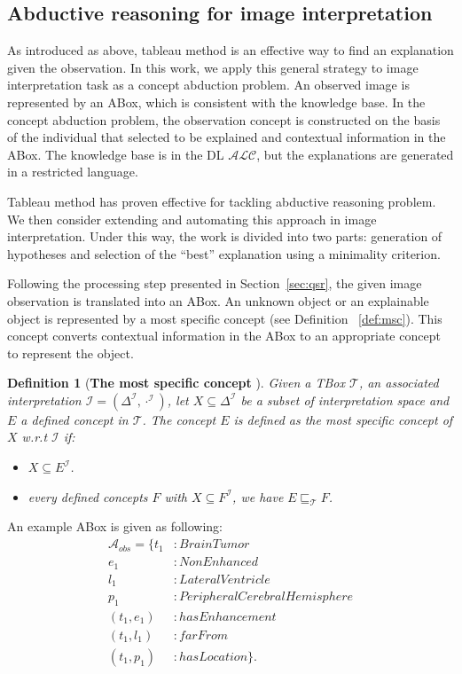 \documentclass{article}
\newtheorem{mydef}{Definition}
\begin{document}
\subsection{Abductive reasoning for image interpretation}
As introduced as above, tableau method is an effective way to find an explanation given the observation.
In this work, we apply this general strategy to image interpretation task as a concept abduction problem.
An observed image is represented by an ABox, which is consistent with the knowledge base. 
In the concept abduction problem, the observation concept is constructed on the basis of the individual that selected to be explained and
contextual information in the ABox.
The knowledge base is in the DL $\mathcal{ALC}$, but the explanations are generated in a restricted language.


Tableau method has proven effective for tackling abductive reasoning problem. We then consider extending and automating this approach in image interpretation.
Under this way, the work is divided into two parts: generation of hypotheses and selection of the ``best'' explanation using a minimality criterion.

Following the processing step presented in Section~\ref{sec:qsr}, the given image observation is translated into an ABox.
An unknown object or an explainable object is represented by a most specific concept (see Definition ~\ref{def:msc}).
This concept converts contextual information in the ABox to an appropriate concept to represent the object.
\begin{mydef}[\textbf{The most specific concept} \cite{atif2014explanatory}]
Given a TBox $\mathcal{T}$, an associated interpretation $\mathcal{I}=(\Delta^{\mathcal{I}}, \cdot^{\mathcal{I}})$,
let $X\subseteq \Delta^{\mathcal{I}}$ be a subset of interpretation space and $E$ a defined concept in $\mathcal{T}$. 
The concept $E$ is defined as the most specific concept of $X$ w.r.t $\mathcal{I}$ if:
\begin{itemize}
 \item $X \subseteq E^{\mathcal{I}}$.
 \item every defined concepts $F$ with $X \subseteq F^{\mathcal{I}}$, we have $E \sqsubseteq_{\mathcal{T}} F$.
\end{itemize}
\end{mydef}\label{def:msc}

An example ABox is given as following:
\vspace{-0.3cm}
\begin{align*}
\mathcal{A}_{obs} =\{t_1&: BrainTumor\\
 e_1&: NonEnhanced\\
 l_1&: LateralVentricle\\
 p_1&: PeripheralCerebralHemisphere\\
 (t_1, e_1)&:hasEnhancement\\
 (t_1, l_1)&:farFrom\\
 (t_1, p_1)&:hasLocation\}.
\end{align*}
\end{document}
